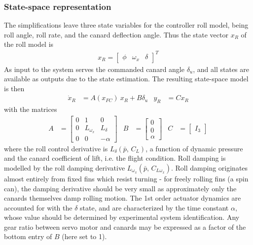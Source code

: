 \subsubsection{State-space representation}
The simplifications leave three state variables for the controller roll model, being roll angle, roll rate, and the canard deflection angle.
Thus the state vector $x_R$ of the roll model is 
\begin{align}
    x_R = \begin{bmatrix} \phi & \omega_x & \delta \end{bmatrix}^T
    \label{eq:controller-model-state}
\end{align}
As input to the system serves the commanded canard angle $\delta_u$, and all states are available as outputs due to the state estimation.
The resulting state-space model is then 
\begin{align}
    \dot x_R &= A(x_{FC}) \: x_R + B \delta_u 
    &
    y_R &= C x_R
    \label{eq:controller-model-ss}
\end{align}
with the matrices
\begin{align}    
    A &= \begin{bmatrix}
        0 & 1 & 0 \\
        0 & L_{\omega_x} & L_\delta \\
        0 & 0 & -\alpha
    \end{bmatrix}
    &
    B &= \begin{bmatrix}
        0 \\ 0 \\ \alpha
    \end{bmatrix}
    &
    C &= \begin{bmatrix} I_3 \end{bmatrix}
    \label{eq:controller-model-matrices}
\end{align}
where the roll control derivative is $L_\delta (\bar p,  \,  C_L)$, a function of dynamic pressure and the canard coefficient of lift, i.e. the flight condition.
Roll damping is modelled by the roll damping derivative $L_{\omega_x} (\bar p, \, C_{L \omega_x})$.
Roll damping originates almost entirely from fixed fins which resist turning - for freely rolling fins (a spin can), the damping derivative should be very small as approximately only the canards themselves damp rolling motion.
The 1st order actuator dynamics are accounted for with the $\delta$ state, and are characterized by the time constant $\alpha$, whose value should be determined by experimental system identification.
Any gear ratio between servo motor and canards may be expressed as a factor of the bottom entry of $B$ (here set to 1).